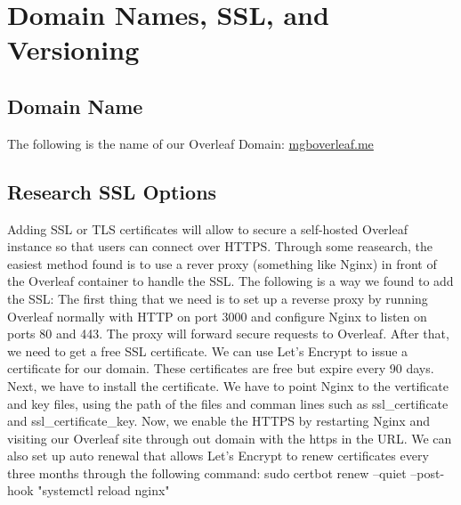 \chapter{Domain Names, SSL, and Versioning\\
}
\label{Chapter!Domain Names, SSL, and Versioning}

\section{Domain Name}
The following is the name of our Overleaf Domain:
\href{mgboverleaf.me}{mgboverleaf.me}

\section{Research SSL Options}
Adding SSL or TLS certificates will allow to secure a self-hosted Overleaf instance so that users can connect over HTTPS. Through some reasearch, the easiest method found is to use a rever proxy (something like Nginx) in front of the Overleaf container to handle the SSL. The following is a way we found to add the SSL:
\newline \newline
The first thing that we need is to set up a reverse proxy by running Overleaf normally with HTTP on port 3000 and configure Nginx to listen on ports 80 and 443. The proxy will forward secure requests to Overleaf.
\newline \newline
After that, we need to get a free SSL certificate. We can use Let's Encrypt to issue a certificate for our domain. These certificates are free but expire every 90 days.
\newline \newline
Next, we have to install the certificate. We have to point Nginx to the vertificate and key files, using the path of the files and comman lines such as ssl\_certificate and ssl\_certificate\_key.
\newline \newline
Now, we enable the HTTPS by restarting Nginx and visiting our Overleaf site through out domain with the https in the URL.
\newline \newline
We can also set up auto renewal that allows Let's Encrypt to renew certificates every three months through the following command:
sudo certbot renew --quiet --post-hook "systemctl reload nginx"


